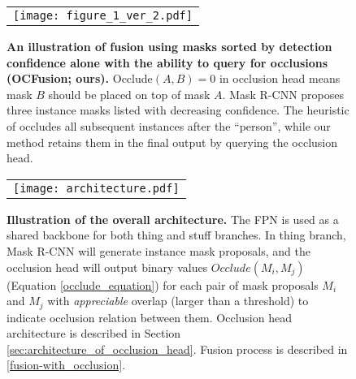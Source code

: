 \documentclass[10pt,twocolumn,letterpaper]{article}
\begin{document}
\begin{figure}[!ht]
\vspace{-1mm}
\begin{center}
\begin{tabular} {c}
\texttt{[image: figure\_1\_ver\_2.pdf]}
\end{tabular}
\end{center}
\vspace{-10mm}
\caption{\textbf{An illustration of fusion using masks sorted by detection confidence alone \cite{kirillov2018panoptic} \vs with the ability to query for occlusions (OCFusion; ours).} Occlude$(A,B)=0$ in occlusion head means mask $B$ should be placed on top of mask $A$. Mask R-CNN proposes three instance masks listed with decreasing confidence. The heuristic of \cite{kirillov2018panoptic} 
occludes all subsequent instances after the ``person'', while our method retains them in the final output by querying the occlusion head.}
\vspace{-5mm}
\label{fig:fusion_process}
\end{figure}

\begin{figure*}[!htp]
\vspace{-5mm} 
\begin{center}
\begin{tabular} {c}
\texttt{[image: architecture.pdf]}
\end{tabular}
\end{center}
\vspace{-5mm}
\caption{\textbf{Illustration of the overall architecture.} The FPN is used as a shared backbone for both thing and stuff branches. In thing branch, Mask R-CNN will generate instance mask proposals, and the occlusion head will output binary values $Occlude(M_i, M_j)$ (Equation \ref{occlude_equation}) for each pair of mask proposals $M_i$ and $M_j$ with \textit{appreciable} overlap (larger than a threshold) to indicate occlusion relation between them. Occlusion head architecture is described in Section \ref{sec:architecture_of_occlusion_head}. Fusion process is described in \ref{fusion-with_occlusion}.}
\vspace{-4mm}
\label{fig:overall_architecture}
\end{figure*}
\end{document}
